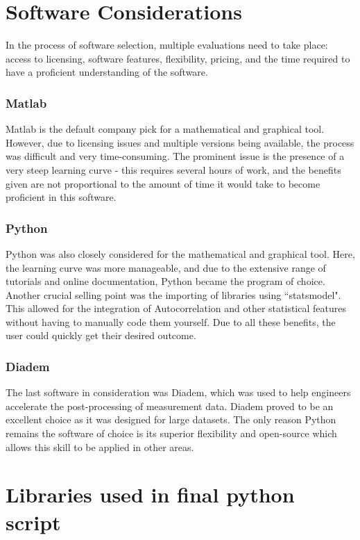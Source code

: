 \section{Software Considerations}

\raggedright
In the process of software selection, multiple evaluations need to take place: access to licensing, software features, flexibility, pricing, and the time required to have a proficient understanding of the software.

\subsubsection{Matlab}

Matlab is the default company pick for a mathematical and graphical tool. However, due to licensing issues and multiple versions being available, the process was difficult and very time-consuming. The prominent issue is the presence of a very steep learning curve - this requires several hours of work, and the benefits given are not proportional to the amount of time it would take to become proficient in this software.

\subsubsection{Python}
Python was also closely considered for the mathematical and graphical tool. Here, the learning curve was more manageable, and due to the extensive range of tutorials and online documentation, Python became the program of choice. Another crucial selling point was the importing of libraries using ``statsmodel". This allowed for the integration of Autocorrelation and other statistical features without having to manually code them yourself. Due to all these benefits, the user could quickly get their desired outcome.

\subsubsection{Diadem}
The last software in consideration was Diadem, which was used to help engineers accelerate the post-processing of measurement data. Diadem proved to be an excellent choice as it was designed for large datasets. The only reason Python remains the software of choice is its superior flexibility and open-source which allows this skill to be applied in other areas. 

\section{Libraries used in final python script}

